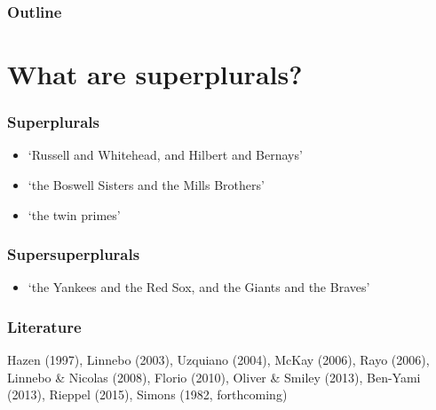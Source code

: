 \documentclass[serif]{beamer}
\begin{document}
\begin{frame}
\frametitle{Outline}
\tableofcontents
\end{frame}

\section{What are superplurals?}

\begin{frame}
\frametitle{Superplurals}

\begin{itemize}
  \item `Russell and Whitehead, and Hilbert and Bernays'
  \item `the Boswell Sisters and the Mills Brothers'
  \item `the twin primes'
\end{itemize}
\end{frame}

\begin{frame}
\frametitle{Supersuperplurals}
\begin{itemize}
  \item `the Yankees and the Red Sox, and the Giants and the Braves'
\end{itemize}
\end{frame}

\begin{frame}
\frametitle{Literature}

Hazen (1997), Linnebo (2003), Uzquiano (2004), McKay (2006), Rayo (2006), Linnebo \& Nicolas (2008), Florio (2010), Oliver \& Smiley (2013), Ben-Yami (2013), Rieppel (2015), Simons (1982, forthcoming)


\end{frame}
\end{document}

